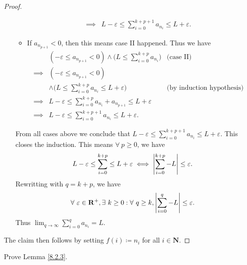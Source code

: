 \begin{proof}
\begin{itemize}
\begin{itemize}
\begin{align*}
                            \implies & L - \varepsilon \leq \sum_{i = 0}^{k + p + 1} a_{n_i} \leq L + \varepsilon.
                        \end{align*}
                  \item If \(a_{n_{p + 1}} < 0\), then this means case II happened.
                        Thus we have
                        \begin{align*}
                                     & (-\varepsilon \leq a_{n_{p + 1}} < 0) \land \Bigg(L \leq \sum_{i = 0}^{k + p} a_{n_i}\Bigg) & \text{(case II)}                 \\
                            \implies & (-\varepsilon \leq a_{n_{p + 1}} < 0)                                                                                          \\
                                     & \land \Bigg(L \leq \sum_{i = 0}^{k + p} a_{n_i} \leq L + \varepsilon\Bigg)                  & \text{(by induction hypothesis)} \\
                            \implies & L - \varepsilon \leq \sum_{i = 0}^{k + p} a_{n_i} + a_{n_{p + 1}} \leq L + \varepsilon                                         \\
                            \implies & L - \varepsilon \leq \sum_{i = 0}^{k + p + 1} a_{n_i} \leq L + \varepsilon.
                        \end{align*}
              \end{itemize}
              From all cases above we conclude that \(L - \varepsilon \leq \sum_{i = 0}^{k + p + 1} a_{n_i} \leq L + \varepsilon\).
              This closes the induction.
              This means \(\forall\ p \geq 0\), we have
              \[
                  L - \varepsilon \leq \sum_{i = 0}^{k + p} \leq L + \varepsilon \iff \abs*{\sum_{i = 0}^{k + p} - L} \leq \varepsilon.
              \]
              Rewritting with \(q = k + p\), we have
              \[
                  \forall\ \varepsilon \in \mathbf{R}^+, \exists\ k \geq 0 : \forall\ q \geq k, \abs*{\sum_{i = 0}^q - L} \leq \varepsilon.
              \]
              Thus \(\lim_{q \to \infty} \sum_{i = 0}^q a_{n_i} = L\).
    \end{itemize}
    The claim then follows by setting \(f(i) \coloneqq n_i\) for all \(i \in \mathbf{N}\).
\end{proof}

\exercisesection

\begin{exercise}\label{ex 8.2.1}
    Prove Lemma \ref{8.2.3}.
\end{exercise}

